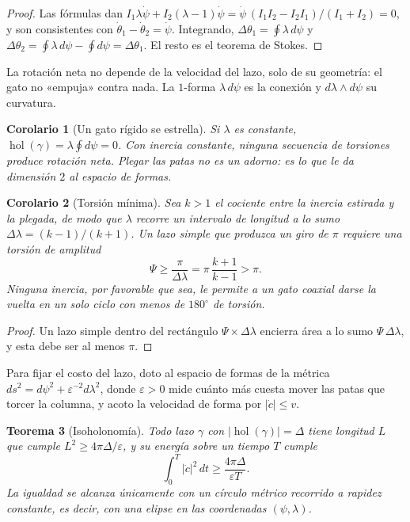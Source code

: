 \documentclass[11pt,a4paper]{article}
\theoremstyle{plain}
\newtheorem{teorema}{Teorema}[section]
\newtheorem{corolario}[teorema]{Corolario}
\theoremstyle{definition}
\theoremstyle{remark}
\numberwithin{equation}{section}
\DeclareMathOperator{\hol}{hol}
\begin{document}
\begin{proof}
Las fórmulas dan $I_1\lambda\dot\psi+I_2(\lambda-1)\dot\psi=\dot\psi\,(I_1I_2-I_2I_1)/(I_1+I_2)=0$, y son consistentes con $\dot\theta_1-\dot\theta_2=\dot\psi$. Integrando, $\Delta\theta_1=\oint\lambda\,d\psi$ y $\Delta\theta_2=\oint\lambda\,d\psi-\oint d\psi=\Delta\theta_1$. El resto es el teorema de Stokes.
\end{proof}

La rotación neta no depende de la velocidad del lazo, solo de su geometría: el gato no «empuja» contra nada. La $1$-forma $\lambda\,d\psi$ es la conexión y $d\lambda\wedge d\psi$ su curvatura.

\begin{corolario}[Un gato rígido se estrella]\label{cor:rigido}
Si $\lambda$ es constante, $\hol(\gamma)=\lambda\oint d\psi=0$. Con inercia constante, ninguna secuencia de torsiones produce rotación neta. Plegar las patas no es un adorno: es lo que le da dimensión $2$ al espacio de formas.
\end{corolario}

\begin{corolario}[Torsión mínima]\label{cor:torsion}
Sea $k>1$ el cociente entre la inercia estirada y la plegada, de modo que $\lambda$ recorre un intervalo de longitud a lo sumo $\Delta\lambda=(k-1)/(k+1)$. Un lazo simple que produzca un giro de $\pi$ requiere una torsión de amplitud
\begin{equation}
  \Psi\ge\frac{\pi}{\Delta\lambda}=\pi\,\frac{k+1}{k-1}>\pi.
\end{equation}
Ninguna inercia, por favorable que sea, le permite a un gato coaxial darse la vuelta en un solo ciclo con menos de $180^\circ$ de torsión.
\end{corolario}

\begin{proof}
Un lazo simple dentro del rectángulo $\Psi\times\Delta\lambda$ encierra área a lo sumo $\Psi\,\Delta\lambda$, y esta debe ser al menos $\pi$.
\end{proof}

Para fijar el costo del lazo, doto al espacio de formas de la métrica $ds^2=d\psi^2+\varepsilon^{-2}d\lambda^2$, donde $\varepsilon>0$ mide cuánto más cuesta mover las patas que torcer la columna, y acoto la velocidad de forma por $|\dot c|\le v$.

\begin{teorema}[Isoholonomía]\label{teo:isoholonomia}
Todo lazo $\gamma$ con $|\hol(\gamma)|=\Delta$ tiene longitud $L$ que cumple $L^2\ge 4\pi\Delta/\varepsilon$, y su energía sobre un tiempo $T$ cumple
\begin{equation}
  \int_0^T|\dot c|^2\,dt\ge\frac{4\pi\Delta}{\varepsilon T}.
\end{equation}
La igualdad se alcanza únicamente con un círculo métrico recorrido a rapidez constante, es decir, con una elipse en las coordenadas $(\psi,\lambda)$.
\end{teorema}
\end{document}
